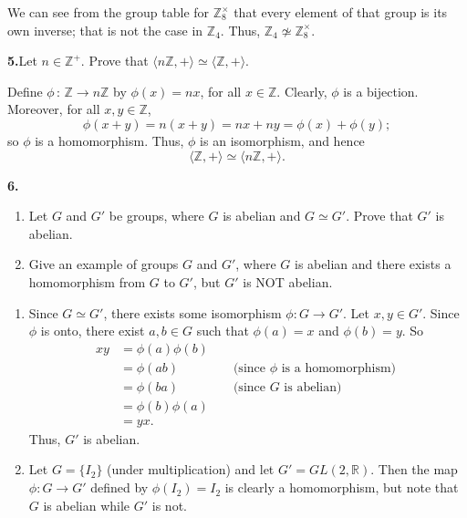 \documentclass[10pt,]{book}
\theoremstyle{plain}
\theoremstyle{definition}
\theoremstyle{definition}
\theoremstyle{definition}
\theoremstyle{definition}
\numberwithin{equation}{section}
\def\Z{\mathbb{Z}}
\def\R{\mathbb{R}}
\newcommand{\amp}{&}
\begin{document}
We can see from the group table for \(\Z_8^{\times}\) that every element of that group is its own inverse; that is not the case in \(\Z_4\). Thus, \(\Z_4\not\simeq\Z_8^{\times}\).%
\par\smallskip
\noindent\textbf{5.}\quad{}Let \(n\in \Z^+\). Prove that \(\langle n\Z,+\rangle  \simeq \langle \Z,+\rangle\).%
\par\smallskip
Define \(\phi\,:\,\Z \rightarrow n\Z\) by \(\phi(x)=nx\), for all \(x\in \Z\). Clearly, \(\phi\) is a bijection. Moreover, for all \(x,y\in \Z\),%
\begin{equation*}
\phi(x+y)=n(x+y)=nx+ny=\phi(x)+\phi(y);
\end{equation*}
so \(\phi\) is a homomorphism. Thus, \(\phi\) is an isomorphism, and hence%
\begin{equation*}
\langle \Z, +\rangle \simeq \langle n\Z, +\rangle .
\end{equation*}
%
\par\smallskip
\noindent\textbf{6.}\quad{}\leavevmode%
\begin{enumerate}[label=(\alph*)]
\item\hypertarget{li-176}{}Let \(G\) and \(G'\) be groups, where \(G\) is abelian and  \(G\simeq G'\). Prove that \(G'\) is abelian.%
\item\hypertarget{li-177}{}Give an example of groups \(G\) and \(G'\), where \(G\) is abelian and there exists a homomorphism from \(G\) to \(G'\), but \(G'\) is NOT abelian.%
\end{enumerate}
\par\smallskip
\leavevmode%
\begin{enumerate}[label=(\alph*)]
\item\hypertarget{li-178}{}Since \(G\simeq G'\), there exists some isomorphism \(\phi:G\to G'\).  Let \(x,y\in G'\).  Since \(\phi\) is onto, there exist \(a,b\in G\) such that \(\phi(a)=x\) and \(\phi(b)=y\).  So%
\begin{align*}
xy\amp =\phi(a)\phi(b)\amp \amp\\
\amp =\phi(ab)\amp \amp \text{ (since \(\phi\) is a homomorphism) }\\
\amp =\phi(ba) \amp \amp \text{ (since \(G\) is abelian) }\\
\amp =\phi(b)\phi(a)\\
\amp =yx.
\end{align*}
Thus, \(G'\) is abelian.%
\item\hypertarget{li-179}{}Let \(G=\{I_2\}\) (under multiplication) and let \(G'=GL(2,\R)\). Then the map \(\phi: G\to G'\) defined by \(\phi(I_2)=I_2\) is clearly a homomorphism, but note that \(G\) is abelian while \(G'\) is not.%
\end{enumerate}
\end{document}
